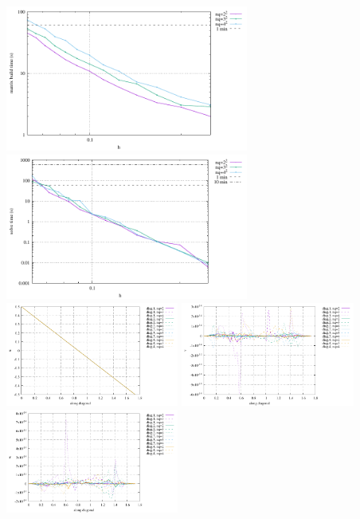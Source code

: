 \begin{center}
\includegraphics[width=8cm]{python_codes/fieldstone_82/RESULTS/bench2/build.pdf}
\includegraphics[width=8cm]{python_codes/fieldstone_82/RESULTS/bench2/solve.pdf}\\
\includegraphics[width=5.7cm]{python_codes/fieldstone_82/RESULTS/bench2/diags_u.pdf}
\includegraphics[width=5.7cm]{python_codes/fieldstone_82/RESULTS/bench2/diags_v.pdf}
\includegraphics[width=5.7cm]{python_codes/fieldstone_82/RESULTS/bench2/diags_w.pdf}\\

\end{center}
